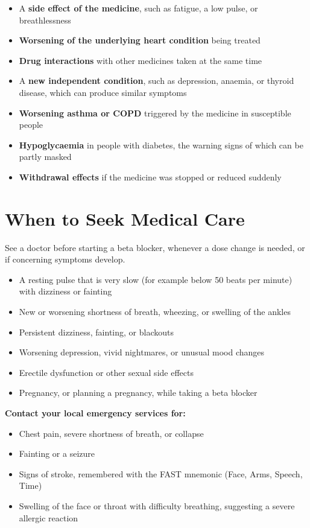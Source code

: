 \begin{itemize}
    \item A \textbf{side effect of the medicine}, such as fatigue, a low pulse, or breathlessness
    \item \textbf{Worsening of the underlying heart condition} being treated
    \item \textbf{Drug interactions} with other medicines taken at the same time
    \item A \textbf{new independent condition}, such as depression, anaemia, or thyroid disease, which can produce similar symptoms
    \item \textbf{Worsening asthma or COPD} triggered by the medicine in susceptible people
    \item \textbf{Hypoglycaemia} in people with diabetes, the warning signs of which can be partly masked
    \item \textbf{Withdrawal effects} if the medicine was stopped or reduced suddenly
\end{itemize}

\section*{When to Seek Medical Care}
See a doctor before starting a beta blocker, whenever a dose change is needed, or if concerning symptoms develop.

\begin{itemize}
    \item A resting pulse that is very slow (for example below 50 beats per minute) with dizziness or fainting
    \item New or worsening shortness of breath, wheezing, or swelling of the ankles
    \item Persistent dizziness, fainting, or blackouts
    \item Worsening depression, vivid nightmares, or unusual mood changes
    \item Erectile dysfunction or other sexual side effects
    \item Pregnancy, or planning a pregnancy, while taking a beta blocker
\end{itemize}

\textbf{Contact your local emergency services for:}
\begin{itemize}
    \item Chest pain, severe shortness of breath, or collapse
    \item Fainting or a seizure
    \item Signs of stroke, remembered with the FAST mnemonic (Face, Arms, Speech, Time)
    \item Swelling of the face or throat with difficulty breathing, suggesting a severe allergic reaction
\end{itemize}

